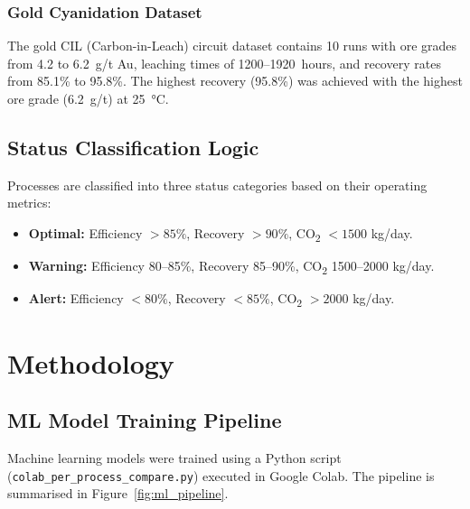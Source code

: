 \documentclass[12pt,a4paper]{report}
\newcommand{\code}[1]{\texttt{#1}}
\begin{document}
\subsection{Gold Cyanidation Dataset}

The gold CIL (Carbon-in-Leach) circuit dataset contains 10 runs with ore grades from 4.2 to 6.2~g/t Au, leaching times of 1200–1920~hours, and recovery rates from 85.1\% to 95.8\%. The highest recovery (95.8\%) was achieved with the highest ore grade (6.2~g/t) at \SI{25}{\degreeCelsius}.

\section{Status Classification Logic}

Processes are classified into three status categories based on their operating metrics:

\begin{itemize}[nosep]
  \item \textbf{Optimal:} Efficiency $> 85\%$, Recovery $> 90\%$, CO\textsubscript{2} $< 1500$ kg/day.
  \item \textbf{Warning:} Efficiency 80–85\%, Recovery 85–90\%, CO\textsubscript{2} 1500–2000 kg/day.
  \item \textbf{Alert:} Efficiency $< 80\%$, Recovery $< 85\%$, CO\textsubscript{2} $> 2000$ kg/day.
\end{itemize}


\chapter{Methodology}
\label{ch:methodology}

\section{ML Model Training Pipeline}

Machine learning models were trained using a Python script (\code{colab\_per\_process\_compare.py}) executed in Google Colab. The pipeline is summarised in Figure~\ref{fig:ml_pipeline}.
\end{document}

